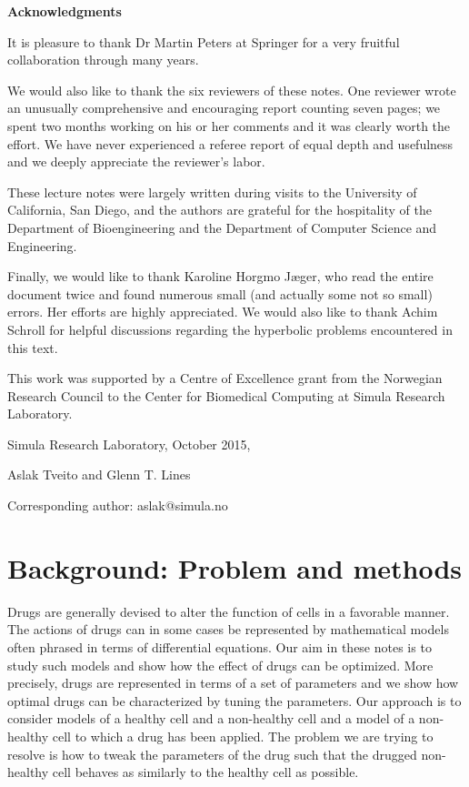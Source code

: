 \bigskip
\bigskip

{\bf Acknowledgments}

\bigskip

It is pleasure to thank Dr Martin Peters at Springer for a very fruitful collaboration through many years.

We would also like to thank the six reviewers of these notes. One reviewer wrote an unusually comprehensive and encouraging report counting seven pages; we spent two months working on his or her comments and it was clearly worth the effort. We have never experienced a referee report of equal depth and usefulness and we deeply appreciate the reviewer's labor.  

These lecture notes were largely written during visits to the University of California, San Diego, and the authors are grateful for the hospitality of the Department of Bioengineering and the Department of Computer Science and Engineering.

Finally, we would like to thank Karoline Horgmo J\ae ger, who read the entire document twice and found numerous small (and actually some not so small) errors. Her efforts are highly appreciated. We would also like to thank Achim Schroll for helpful discussions regarding the hyperbolic problems encountered in this text. 

This work was supported by a Centre of Excellence grant from the Norwegian Research Council to the Center for Biomedical Computing at Simula Research Laboratory.

\bigskip
\bigskip

Simula Research Laboratory, October 2015,

\bigskip


Aslak Tveito and Glenn T. Lines

\bigskip
\bigskip

Corresponding author: aslak@simula.no



\chapter{Background: Problem and methods \label{Background}}

Drugs are generally devised to alter the function of cells in a favorable manner. The actions of drugs can in some cases be represented by mathematical models often phrased in terms of differential equations. Our aim in these notes is to study such models and show how the effect of drugs can be optimized. More precisely, drugs are represented in terms of a set of parameters and we show how optimal drugs can be characterized by tuning the parameters. Our approach is to consider models of a healthy cell and a non-healthy cell and a model of a non-healthy cell to which a drug has been applied. The problem we are trying to resolve is how to tweak the parameters of the drug such that the drugged non-healthy cell behaves as similarly to the healthy cell as possible.

